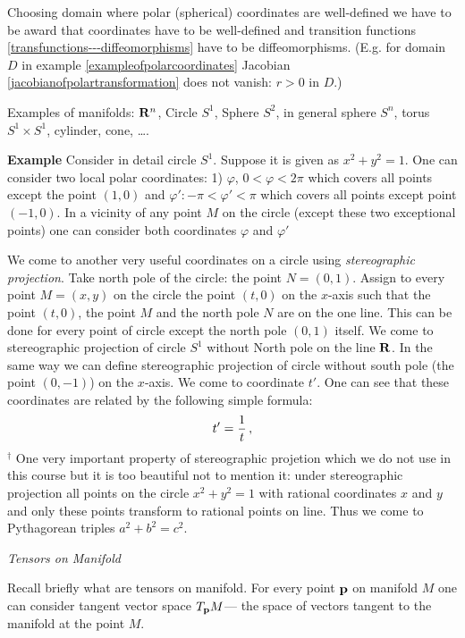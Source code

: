 \documentclass[12pt]{article}
\theoremstyle{theorem}
\numberwithin{equation}{section}
\begin{document}
 Choosing domain where polar (spherical) coordinates are well-defined
we have to be award
that coordinates have to be well-defined and
transition functions \eqref{transfunctions---diffeomorphisms}
  have to be diffeomorphisms. (E.g. for domain $D$
in example \eqref{exampleofpolarcoordinates} Jacobian
\eqref{jacobianofpolartransformation} does not vanish: $r>0$ in $D$.)
\m


Examples of manifolds: ${\bf R}^n$, Circle $S^1$,  Sphere $S^2$, in general sphere $S^n$, torus $S^1\times S^1$,
  cylinder, cone, \dots.

{\bf Example} Consider in detail circle $S^1$.
  Suppose it is given as $x^2+y^2=1$.
One can consider two local polar coordinates:
1) $\varphi$, $0<\varphi<2\pi$  which covers all points except the point
$(1,0)$ and $\varphi'\colon -\pi<\varphi'<\pi$ which covers all points
except point $(-1,0)$. In a vicinity of
any point $M$ on the circle (except
these two exceptional points) one can consider both coordinates
$\varphi$ and $\varphi'$


We come to another
 very useful coordinates on a circle using {\it stereographic projection}.
Take north pole of the circle: the point $N=(0,1)$.
Assign to every point  $M=(x,y)$ on the circle
the point $(t,0)$ on the $x$-axis such that the point $(t,0)$,
the point $M$ and the north pole $N$ are on the one line.
This can be done for every point
of circle except the north pole $(0,1)$ itself.
We come to stereographic projection of circle $S^1$ without North pole
on the line ${\bf R}$. In the same way we can define
stereographic projection of circle
without south pole (the point $(0,-1)$)
on the $x$-axis. We come to coordinate $t'$.
One can see that these coordinates are related
by the following simple formula:
             $$
          t'={1\over t}\,,
             $$
{\small $^\dagger$ One very important property of stereographic projetion
which we do not use in this course but it is too beautiful not to mention it:
under stereographic projection  all points
on the circle $x^2+y^2=1$
with rational coordinates $x$ and $y$ and only these points
transform to rational points on line. Thus we come to
Pythagorean triples $a^2+b^2=c^2$.}






        \centerline {\it Tensors on Manifold}

Recall briefly what are tensors on manifold.
For every point ${\bf p}$ on manifold $M$
one can consider tangent vector space $T_{\bf p} M$---
the space of vectors tangent to the manifold at the point $M$.
\end{document}
